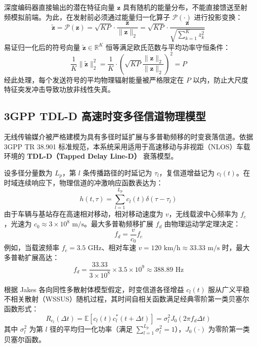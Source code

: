深度编码器直接输出的潜在特征向量 $\bm{z}$ 具有随机的能量分布，不能直接馈送至射频模拟前端。为此，在发射前必须通过能量归一化算子 $\mathcal{P}(\cdot)$ 进行投影变换：
\begin{equation}
  \tilde{\bm{z}} = \mathcal{P}(\bm{z}) = \sqrt{K P} \cdot \frac{\bm{z}}{\|\bm{z}\|_2} = \sqrt{K P} \cdot \frac{\bm{z}}{\sqrt{\sum_{k=1}^K z_k^2}}
  \label{eq:power_normalization_rigorous}
\end{equation}
易证归一化后的符号向量 $\tilde{\bm{z}} \in \mathbb{R}^K$ 恒等满足欧氏范数与平均功率守恒条件：
\begin{equation}
  \frac{1}{K} \|\tilde{\bm{z}}\|_2^2 = \frac{1}{K} \cdot \left( \sqrt{K P} \frac{\|\bm{z}\|_2}{\|\bm{z}\|_2} \right)^2 = P
  \label{eq:power_proof}
\end{equation}
经此处理，每个发送符号的平均物理辐射能量被严格限定在 $P$ 以内，防止大尺度特征突发冲击导致功放非线性失真。

\subsection{3GPP TDL-D 高速时变多径信道物理模型}
无线传输媒介被严格建模为具有多径时延扩展与多普勒频移的时变衰落信道。依据 3GPP TR 38.901 标准规范，本系统采用适用于高速移动与非视距（NLOS）车载环境的 \textbf{TDL-D（Tapped Delay Line-D）} 衰落模型。

设多径分量数为 $L_p$，第 $l$ 条传播路径的时延记为 $\tau_l$，复信道增益记为 $c_l(t)$。在时域连续响应下，物理信道的冲激响应函数表达为：
\begin{equation}
  h(t, \tau) = \sum_{l=1}^{L_p} c_l(t) \delta(\tau - \tau_l)
  \label{eq:channel_impulse_response}
\end{equation}
由于车辆与基站存在高速相对移动，相对移动速度为 $v$，无线载波中心频率为 $f_c$，光速为 $c_0 \approx 3 \times 10^8\text{ m/s}$。最大多普勒频移扩展 $f_d$ 由物理运动学定理决定：
\begin{equation}
  f_d = \frac{v}{c_0} f_c
  \label{eq:doppler_freq}
\end{equation}
例如，当载波频率 $f_c = 3.5\text{ GHz}$、相对车速 $v = 120\text{ km/h} \approx 33.33\text{ m/s}$ 时，最大多普勒扩展高达：
\begin{equation}
  f_d = \frac{33.33}{3 \times 10^8} \times 3.5 \times 10^9 \approx 388.89\text{ Hz}
\end{equation}

根据 Jakes 各向同性多散射体模型假定，时变信道各径增益 $c_l(t)$ 服从广义平稳不相关散射（WSSUS）随机过程，其时间自相关函数满足经典零阶第一类贝塞尔函数形式：
\begin{equation}
  R_{c_l}(\Delta t) = \mathbb{E}[c_l(t) c_l^*(t + \Delta t)] = \sigma_l^2 J_0(2\pi f_d \Delta t)
  \label{eq:bessel_autocorrelation}
\end{equation}
其中 $\sigma_l^2$ 为第 $l$ 径的平均归一化功率（满足 $\sum_{l=1}^{L_p} \sigma_l^2 = 1$），$J_0(\cdot)$ 为零阶第一类贝塞尔函数。

